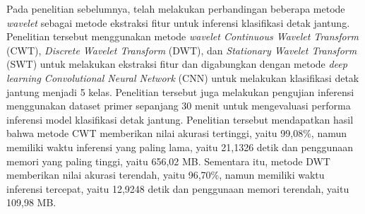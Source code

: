 Pada penelitian sebelumnya, \textcite{sururiComparisonSeveralWavelet2023} telah melakukan perbandingan beberapa metode \textit{wavelet} sebagai metode ekstraksi fitur untuk inferensi klasifikasi detak jantung. 
Penelitian tersebut menggunakan metode \textit{wavelet Continuous Wavelet Transform} (CWT), \textit{Discrete Wavelet Transform} (DWT), dan \textit{Stationary Wavelet Transform} (SWT) untuk melakukan ekstraksi fitur dan digabungkan dengan metode \textit{deep learning Convolutional Neural Network} (CNN) untuk melakukan klasifikasi detak jantung menjadi 5 kelas.
Penelitian tersebut juga melakukan pengujian inferensi menggunakan dataset primer sepanjang 30 menit untuk mengevaluasi performa inferensi model klasifikasi detak jantung.
Penelitian tersebut mendapatkan hasil bahwa metode CWT memberikan nilai akurasi tertinggi, yaitu 99,08\%, namun memiliki waktu inferensi yang paling lama, yaitu 21,1326 detik dan penggunaan memori yang paling tinggi, yaitu 656,02 MB.
Sementara itu, metode DWT memberikan nilai akurasi terendah, yaitu 96,70\%, namun memiliki waktu inferensi tercepat, yaitu 12,9248 detik dan penggunaan memori terendah, yaitu 109,98 MB.

